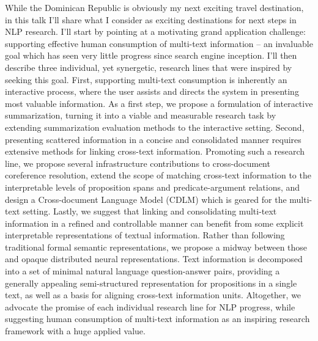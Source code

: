 While the Dominican Republic is obviously my next exciting travel destination, in this talk I’ll share what I consider as exciting destinations for next steps in NLP research. I’ll start by pointing at a motivating grand application challenge: supporting effective human consumption of multi-text information -- an invaluable goal which has seen very little progress since search engine inception. I’ll then describe three individual, yet synergetic, research lines that were inspired by seeking this goal. First, supporting multi-text consumption is inherently an interactive process, where the user assists and directs the system in presenting most valuable information. As a first step, we  propose a formulation of interactive summarization, turning it into a viable and measurable research task by extending summarization evaluation methods to the interactive setting. Second, presenting scattered information in a concise and consolidated manner requires extensive methods for linking cross-text information. Promoting such a  research line, we propose several infrastructure contributions to cross-document coreference resolution, extend the scope of matching cross-text information to the interpretable levels of proposition spans and predicate-argument relations, and design a Cross-document Language Model (CDLM) which is geared for the multi-text
 setting. Lastly, we suggest that linking and consolidating multi-text information in a refined and controllable manner can benefit from some explicit interpretable representations of textual information. Rather than following traditional formal semantic representations, we propose a midway between those and opaque distributed neural representations. Text information is decomposed into a set of minimal natural language question-answer pairs, providing a generally appealing semi-structured representation for propositions in a single text, as well as a basis for aligning cross-text information units. Altogether, we advocate the promise of each individual research line for NLP progress, while suggesting human consumption of multi-text information as an inspiring research framework with a huge applied value.

\vspace{3em}\par

\vfill
\noindent

